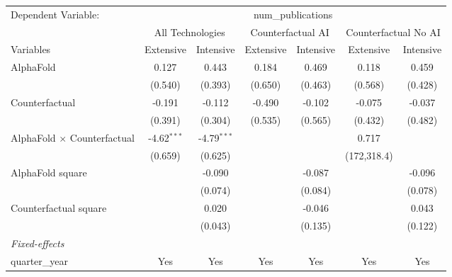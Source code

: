 \begingroup
\centering
\begin{tabular}{lcccccc}
   \tabularnewline \midrule \midrule
   Dependent Variable: & \multicolumn{6}{c}{num\_publications}\\
 & \multicolumn{2}{c}{All Technologies} & \multicolumn{2}{c}{Counterfactual AI} & \multicolumn{2}{c}{Counterfactual No AI} \\
\cmidrule(lr){1-1}\cmidrule(lr){2-3} \cmidrule(lr){4-5} \cmidrule(lr){6-7}
Variables & \multicolumn{1}{c}{Extensive} & \multicolumn{1}{c}{Intensive} & \multicolumn{1}{c}{Extensive} & \multicolumn{1}{c}{Intensive} & \multicolumn{1}{c}{Extensive} & \multicolumn{1}{c}{Intensive} \\
\cmidrule(lr){1-1}\cmidrule(lr){2-2} \cmidrule(lr){3-3} \cmidrule(lr){4-4} \cmidrule(lr){5-5} \cmidrule(lr){6-6} \cmidrule(lr){7-7}
   AlphaFold                          & 0.127         & 0.443         & 0.184   & 0.469   & 0.118       & 0.459\\   
                                      & (0.540)       & (0.393)       & (0.650) & (0.463) & (0.568)     & (0.428)\\   
   Counterfactual                     & -0.191        & -0.112        & -0.490  & -0.102  & -0.075      & -0.037\\   
                                      & (0.391)       & (0.304)       & (0.535) & (0.565) & (0.432)     & (0.482)\\   
   AlphaFold $\times$ Counterfactual  & -4.62$^{***}$ & -4.79$^{***}$ &         &         & 0.717       &   \\   
                                      & (0.659)       & (0.625)       &         &         & (172,318.4) &   \\   
   AlphaFold square                   &               & -0.090        &         & -0.087  &             & -0.096\\   
                                      &               & (0.074)       &         & (0.084) &             & (0.078)\\   
   Counterfactual square              &               & 0.020         &         & -0.046  &             & 0.043\\   
                                      &               & (0.043)       &         & (0.135) &             & (0.122)\\   
   \midrule
   \emph{Fixed-effects}\\
   quarter\_year                      & Yes           & Yes           & Yes     & Yes     & Yes         & Yes\\  

\end{tabular}
